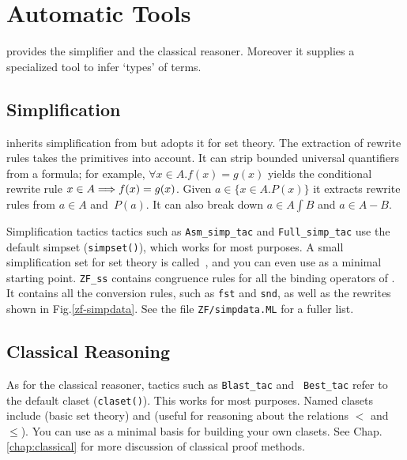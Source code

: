 \section{Automatic Tools}

{\ZF} provides the simplifier and the classical reasoner.   Moreover it
supplies a specialized tool to infer `types' of terms.

\subsection{Simplification}

{\ZF} inherits simplification from {\FOL} but adopts it for set theory.  The
extraction of rewrite rules takes the {\ZF} primitives into account.  It can
strip bounded universal quantifiers from a formula; for example, ${\forall
  x\in A. f(x)=g(x)}$ yields the conditional rewrite rule $x\in A \Longrightarrow
f(x)=g(x)$.  Given $a\in\{x\in A. P(x)\}$ it extracts rewrite rules from $a\in
A$ and~$P(a)$.  It can also break down $a\in A\int B$ and $a\in A-B$.

Simplification tactics tactics such as \texttt{Asm_simp_tac} and
\texttt{Full_simp_tac} use the default simpset (\texttt{simpset()}), which
works for most purposes.  A small simplification set for set theory is
called~, and you can even use  as a minimal
starting point.  \texttt{ZF_ss} contains congruence rules for all the binding
operators of {\ZF}\@.  It contains all the conversion rules, such as
\texttt{fst} and \texttt{snd}, as well as the rewrites shown in
Fig.\ts\ref{zf-simpdata}.  See the file \texttt{ZF/simpdata.ML} for a fuller
list.


\subsection{Classical Reasoning}

As for the classical reasoner, tactics such as \texttt{Blast_tac} and {\tt
  Best_tac} refer to the default claset (\texttt{claset()}).  This works for
most purposes.  Named clasets include  (basic set theory)
and  (useful for reasoning about the relations $<$ and
$\le$).  You can use  as a minimal basis for building your own
clasets.  See %
{Chap.\ts\ref{chap:classical}} for more discussion of classical proof methods.


